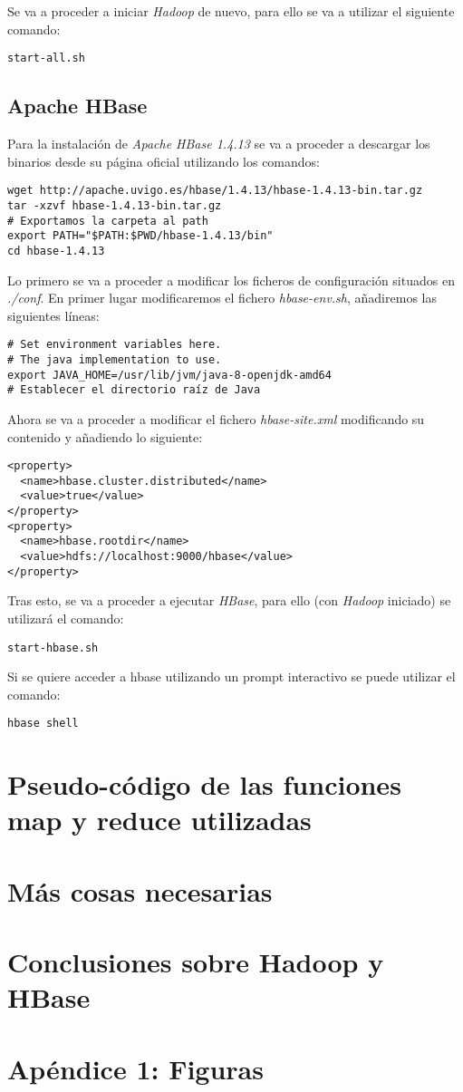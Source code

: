 \documentclass[11pt,a4paper]{article}
\begin{document}
Se va a proceder a iniciar \emph{Hadoop} de nuevo, para ello se va a utilizar el siguiente comando:

\begin{lstlisting}
start-all.sh
\end{lstlisting}

\subsection{Apache HBase}

Para la instalación de \emph{Apache HBase 1.4.13} se va a proceder a descargar los binarios desde su página oficial utilizando los comandos:

\begin{lstlisting}
wget http://apache.uvigo.es/hbase/1.4.13/hbase-1.4.13-bin.tar.gz
tar -xzvf hbase-1.4.13-bin.tar.gz
# Exportamos la carpeta al path
export PATH="$PATH:$PWD/hbase-1.4.13/bin" 
cd hbase-1.4.13
\end{lstlisting}

Lo primero se va a proceder a modificar los ficheros de configuración situados en \emph{./conf}. En primer lugar modificaremos el fichero \emph{hbase-env.sh}, añadiremos las siguientes líneas:

\begin{lstlisting}
# Set environment variables here.
# The java implementation to use.
export JAVA_HOME=/usr/lib/jvm/java-8-openjdk-amd64
# Establecer el directorio raíz de Java
\end{lstlisting}

Ahora se va a proceder a modificar el fichero \emph{hbase-site.xml} modificando su contenido y añadiendo lo siguiente:

\begin{lstlisting}
<property>
  <name>hbase.cluster.distributed</name>
  <value>true</value>
</property>
<property>
  <name>hbase.rootdir</name>
  <value>hdfs://localhost:9000/hbase</value>
</property>
\end{lstlisting}

Tras esto, se va a proceder a ejecutar \emph{HBase}, para ello (con \emph{Hadoop} iniciado) se utilizará el comando:

\begin{lstlisting}
start-hbase.sh
\end{lstlisting}

Si se quiere acceder a hbase utilizando un prompt interactivo se puede utilizar el comando:

\begin{lstlisting}
hbase shell
\end{lstlisting}

\section{Pseudo-código de las funciones map y reduce utilizadas}

\section{Más cosas necesarias}

\section{Conclusiones sobre Hadoop y HBase}

\newpage\section{Apéndice 1: Figuras}
\end{document}
